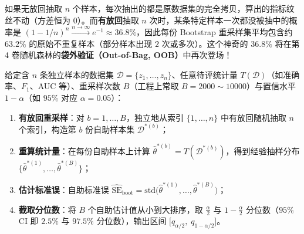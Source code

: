 \begin{remark}
如果无放回抽取 $n$ 个样本，每次抽出的都是原数据集的完全拷贝，算出的指标纹丝不动（方差恒为 0）。而\textbf{有放回}抽取 $n$ 次时，某条特定样本一次都没被抽中的概率是 $(1 - 1/n)^n \xrightarrow{n\to\infty} e^{-1} \approx 36.8\%$，因此每份 Bootstrap 重采样集平均包含约 $63.2\%$ 的原始不重复样本（部分样本出现 $2$ 次或多次）。这个神奇的 $36.8\%$ 将在第 4 卷随机森林的\textbf{袋外验证（Out-of-Bag, OOB）}中再次登场！
\end{remark}

\begin{defBox}
\begin{definition}
\label{def:ch5-bootstrap}
给定含 $n$ 条独立样本的数据集 $\mathcal{D} = \{z_1, \dots, z_n\}$、任意待评统计量 $T(\mathcal{D})$（如准确率、$F_1$、AUC 等）、重采样次数 $B$（工程上常取 $B = 2000 \sim 10000$）与置信水平 $1 - \alpha$（如 $95\%$ 对应 $\alpha = 0.05$）：
\begin{enumerate}
  \item \textbf{有放回重采样}：对 $b = 1, \dots, B$，独立地从索引 $\{1, \dots, n\}$ 中有放回随机抽取 $n$ 个索引，构造第 $b$ 份自助样本集 $\mathcal{D}^{*(b)}$；
  \item \textbf{重算统计量}：在每份自助样本上计算 $\hat{\theta}^{*(b)} = T(\mathcal{D}^{*(b)})$，得到经验抽样分布 $\{\hat{\theta}^{*(1)}, \dots, \hat{\theta}^{*(B)}\}$；
  \item \textbf{估计标准误}：自助标准误 $\widehat{\mathrm{SE}}_{\text{boot}} = \mathrm{std}\big(\hat{\theta}^{*(1)}, \dots, \hat{\theta}^{*(B)}\big)$；
  \item \textbf{截取分位数}：将 $B$ 个自助估计值从小到大排序，取 $\frac{\alpha}{2}$ 与 $1 - \frac{\alpha}{2}$ 分位数（$95\%$ CI 即 $2.5\%$ 与 $97.5\%$ 分位数），输出区间 $\big[q_{\alpha/2},\; q_{1-\alpha/2}\big]$。
\end{enumerate}
\end{definition}
\end{defBox}

